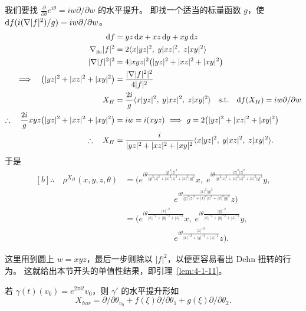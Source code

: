 我们要找 $\frac{\partial}{\partial\theta}e^{i\theta}=iw\partial/\partial w$ 的水平提升。
即找一个适当的标量函数 $g$，使 $\mathrm{d} f(i(\nabla|f|^2)/g)=iw\partial/\partial w$。
\begin{align*}
\mathrm{d} f&=yz\,\mathrm{d} x+xz\,\mathrm{d} y+xy\,\mathrm{d} z\\
\nabla_{g_0}|f|^2&=2\langle x|yz|^2,\;y|xz|^2,\;z|xy|^2\rangle\\
|\nabla|f|^2|^2&=4|xyz|^2\big(|yz|^2+|xz|^2+|xy|^2\big)\\
\Longrightarrow\quad
\big(|yz|^2+|xz|^2+|xy|^2\big)&=\frac{|\nabla|f|^2|^2}{4|f|^2}\\
X_H&=\frac{2i}{g}\langle x|yz|^2,\;y|xz|^2,\;z|xy|^2\rangle
\quad\text{s.t.}\quad \mathrm{d} f(X_H)=iw\partial/\partial w\\
\therefore\quad
\frac{2i}{g}xyz\big(|yz|^2+|xz|^2+|xy|^2\big)&=iw=i(xyz)
\ \Longrightarrow\ g=2\big(|yz|^2+|xz|^2+|xy|^2\big)\\
\therefore\quad X_H&=\frac{i}{|yz|^2+|xz|^2+|xy|^2}
\langle x|yz|^2,\;y|xz|^2,\;z|xy|^2\rangle.
\end{align*}
于是
\begin{equation}\label{eq:4-4}
\begin{aligned}[b]
\therefore\quad \rho^{X_H}(x,y,z,\theta)
&=\Big(e^{i\theta\frac{|y|^2|z|^2}{|y|^2|z|^2+|x|^2|z|^2+|x|^2|y|^2}}x,\;
 e^{i\theta\frac{|x|^2|z|^2}{|y|^2|z|^2+|x|^2|z|^2+|x|^2|y|^2}}y,\\
&\qquad\qquad\qquad
 e^{i\theta\frac{|x|^2|y|^2}{|y|^2|z|^2+|x|^2|z|^2+|x|^2|y|^2}}z\Big)\\
&=\Big(e^{i\theta\frac{|x|^{-2}}{|x|^{-2}+|y|^{-2}+|z|^{-2}}}x,\;
 e^{i\theta\frac{|y|^{-2}}{|x|^{-2}+|y|^{-2}+|z|^{-2}}}y,\\
&\qquad\qquad\qquad
 e^{i\theta\frac{|z|^{-2}}{|x|^{-2}+|y|^{-2}+|z|^{-2}}}z\Big).
\end{aligned}
\end{equation}

这里用到圆上 $w=xyz$，最后一步则除以 $|f|^2$，以便更容易看出 Dehn 扭转的行为。
这就给出本节开头的单值性结果，即引理~\ref{lem:4-1-11}。

\begin{example}\label{ex:4-1-24}
\end{example}

\begin{claim}\label{clm:4-1-25}
若 $\gamma(t)(v_0)=e^{2\pi it}v_0$，则 $\gamma'$ 的水平提升形如
\[
X_{hor}=\partial/\partial\theta_{v_0}+f(\xi)\partial/\partial\theta_1
+g(\xi)\partial/\partial\theta_2.
\]
\end{claim}

